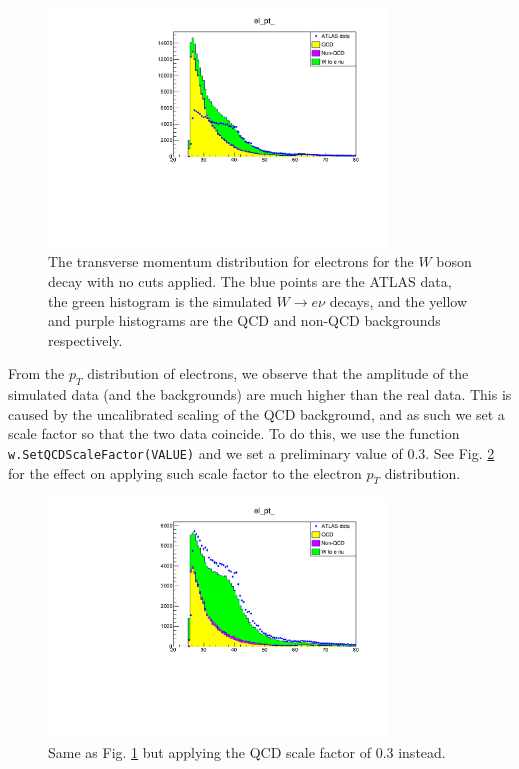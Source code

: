 \documentclass[a4paper]{report}
\numberwithin{equation}{section}
\begin{document}
\begin{figure}[htpb]
    \centering
    \includegraphics[width=0.8\textwidth]{elpt_nocuts.pdf}
    \caption{The transverse momentum distribution for electrons for the $W$ boson decay with no cuts applied. The blue points are the ATLAS data, 
    the green histogram is the simulated $W \rightarrow e\nu$ decays, and the yellow and purple histograms are the QCD and 
    non-QCD backgrounds respectively.}
    \label{fig:elpt_nocuts}
\end{figure}

From the $p_T$ distribution of electrons, we observe that the amplitude of the simulated data (and the backgrounds) are much 
higher than the real data. This is caused by the uncalibrated scaling of the QCD background, and as such we set a scale factor 
so that the two data coincide. To do this, we use the function \texttt{w.SetQCDScaleFactor(VALUE)} and we set a preliminary 
value of 0.3. See Fig. \ref{fig:elpt_qcd30} for the effect on applying such scale factor to the electron $p_T$ distribution. 

\begin{figure}[htpb]
    \centering
    \includegraphics[width=0.8\textwidth]{elpt_qcd30.pdf}
    \caption{Same as Fig. \ref{fig:elpt_nocuts} but applying the QCD scale factor of 0.3 instead.}
    \label{fig:elpt_qcd30}
\end{figure}
\end{document}
